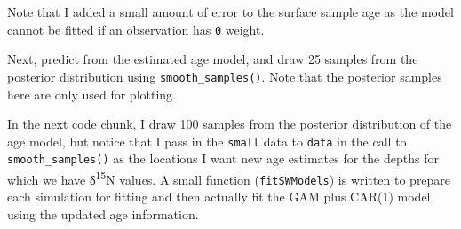 \documentclass[12pt,]{article}
\newenvironment{Shaded}{\begin{snugshade}}{\end{snugshade}}
\newcommand{\CommentTok}[1]{\textcolor[rgb]{0.56,0.35,0.01}{\textit{#1}}}
\newcommand{\DataTypeTok}[1]{\textcolor[rgb]{0.13,0.29,0.53}{#1}}
\newcommand{\DecValTok}[1]{\textcolor[rgb]{0.00,0.00,0.81}{#1}}
\newcommand{\KeywordTok}[1]{\textcolor[rgb]{0.13,0.29,0.53}{\textbf{#1}}}
\newcommand{\NormalTok}[1]{#1}
\newcommand{\OperatorTok}[1]{\textcolor[rgb]{0.81,0.36,0.00}{\textbf{#1}}}
\newcommand{\StringTok}[1]{\textcolor[rgb]{0.31,0.60,0.02}{#1}}
\begin{document}
Note that I added a small amount of error to the surface sample age as
the model cannot be fitted if an observation has \texttt{0} weight.

Next, predict from the estimated age model, and draw 25 samples from the
posterior distribution using \texttt{smooth\_samples()}. Note that the
posterior samples here are only used for plotting.

\begin{Shaded}
\end{Shaded}

In the next code chunk, I draw 100 samples from the posterior
distribution of the age model, but notice that I pass in the
\texttt{small} data to \texttt{data} in the call to
\texttt{smooth\_samples()} as the locations I want new age estimates for
the depths for which we have δ\textsuperscript{15}N values. A small
function (\texttt{fitSWModels}) is written to prepare each simulation
for fitting and then actually fit the GAM plus CAR(1) model using the
updated age information.
\end{document}
